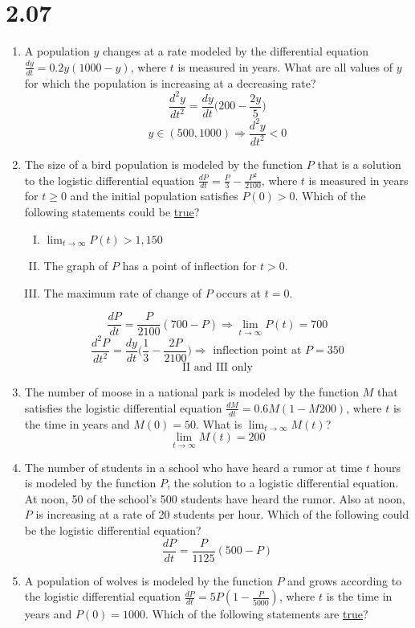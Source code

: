 \documentclass[12pt]{article}
\begin{document}
\section*{2.07}
\begin{enumerate}
    \item A population $y$ changes at a rate modeled by the differential equation $\frac{dy}{dt}=0.2y(1000-y)$, where $t$ is measured in years. What are all values of $y$ for which the population is increasing at a decreasing rate?
    $$\frac{d^2y}{dt^2}=\frac{dy}{dt} \biggr(200-\frac{2y}{5} \biggr)$$
    $$\boxed{y \in (500, 1000) \Longrightarrow \frac{d^2y}{dt^2} < 0 }$$
    \item The size of a bird population is modeled by the function $P$ that is a solution to the logistic differential equation $\frac{dP}{dt}=\frac{P}{3}-\frac{P^2}{2100}$, where $t$ is measured in years for $t\geq 0$ and the initial population satisfies $P(0)>0$. Which of the following statements could be \underline{true}?
    \begin{enumerate}[I.]
        \item $\lim_{t\to\infty} P(t) > 1,150$
        \item The graph of $P$ has a point of inflection for $t>0$.
        \item The maximum rate of change of $P$ occurs at $t=0$.
    \end{enumerate}
$$\frac{dP}{dt}= \frac{P}{2100}(700-P) \Longrightarrow \lim_{t\to\infty} P(t) = 700$$
$$\frac{d^2P}{dt^2}=\frac{dy}{dt} \biggr(\frac{1}{3}-\frac{2P}{2100} \biggr) \Longrightarrow \text{ inflection point at $P=350$}$$
$$\boxed{\text{II and III only}}$$
    \item The number of moose in a national park is modeled by the function $M$ that satisfies the logistic differential equation $\frac{dM}{dt}=0.6M(1-M200)$, where $t$ is the time in years and $M(0)=50$. What is $\lim_{t\to\infty} M(t)$?
    $$\boxed{\lim_{t\to\infty} M(t)=200}$$
    \item The number of students in a school who have heard a rumor at time $t$ hours is modeled by the function $P$, the solution to a logistic differential equation. At noon, 50 of the school’s 500 students have heard the rumor. Also at noon, $P$ is increasing at a rate of 20 students per hour. Which of the following could be the logistic differential equation?
    $$\boxed{\frac{dP}{dt}=\frac{P}{1125}(500-P)}$$
    \item A population of wolves is modeled by the function $P$ and grows according to the logistic differential equation $\frac{dP}{dt}=5P(1-\frac{P}{5000})$, where $t$ is the time in years and $P(0) = 1000$. Which of the following statements are \underline{true}?

\end{enumerate}
\end{document}
